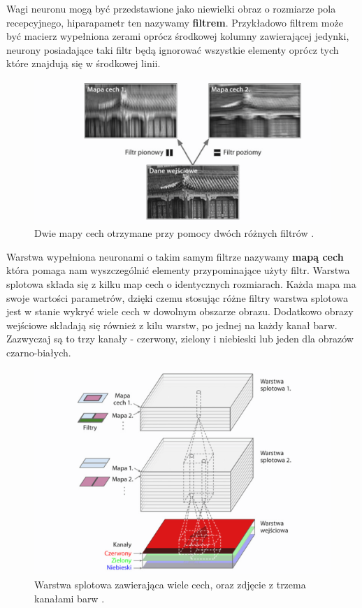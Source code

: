 \documentclass{article}
\begin{document}
\begin{itemize}
Wagi neuronu mogą być przedstawione jako niewielki obraz o rozmiarze pola recepcyjnego, 
hiparapametr ten nazywamy \textbf{filtrem}.
Przykładowo filtrem może być macierz wypełniona zerami oprócz środkowej
kolumny zawierającej jedynki, neurony posiadające taki filtr będą ignorować wszystkie elementy
oprócz tych które znajdują się w środkowej linii.

\begin{figure}[H]
\centering
\includegraphics[scale=0.6]{filtr.png}
\caption{Dwie mapy cech otrzymane przy pomocy dwóch różnych filtrów \cite{um}.}
\end{figure}

Warstwa wypełniona neuronami o takim
samym filtrze nazywamy \textbf{mapą cech} która pomaga nam wyszczególnić elementy przypominające
użyty filtr. Warstwa splotowa składa się z kilku map cech o identycznych rozmiarach.
Każda mapa ma swoje wartości parametrów, dzięki czemu stosując różne filtry 
warstwa splotowa jest w stanie wykryć wiele cech w dowolnym obszarze obrazu.
Dodatkowo obrazy wejściowe składają się również z kilu warstw, po jednej na każdy kanał
barw. Zazwyczaj są to trzy kanały - czerwony, zielony i niebieski lub jeden dla obrazów
czarno-białych.


\begin{figure}[H]
\centering
\includegraphics[scale=0.6]{rgb_cnn.png}
\caption{Warstwa splotowa zawierająca wiele cech, oraz zdjęcie z trzema kanałami barw \cite{um}.}
\end{figure}


\end{itemize}
\end{document}
